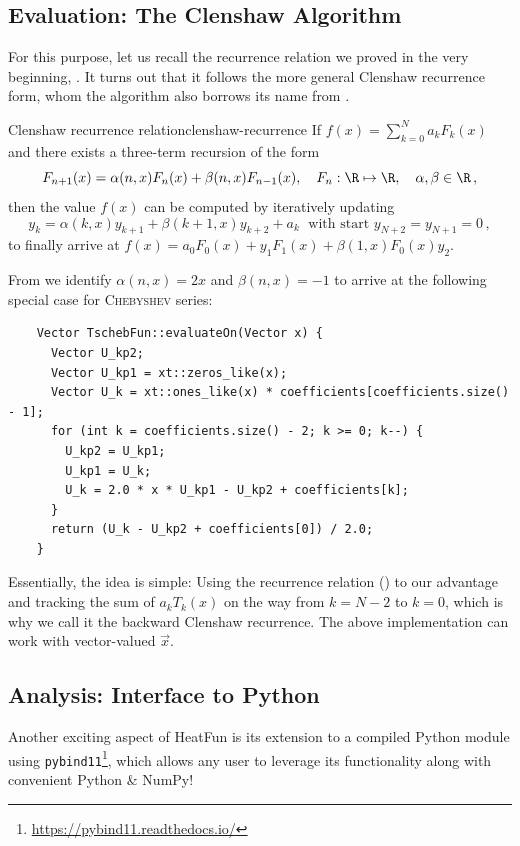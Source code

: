 \documentclass[12pt, a4paper]{article}
\newcommand{\chebyshev}{\textsc{Chebyshev}\xspace}
\newcommand{\heatfun}{\textcolor{themecolor3}{HeatFun}\xspace}
\begin{document}
  \subsection{Evaluation: The Clenshaw Algorithm}
  For this purpose, let us recall the recurrence relation we proved in the very beginning, .
  It turns out that it follows the more general Clenshaw recurrence form, whom the algorithm also borrows its name from \parencite[172-178]{art-of-sci-comp}.
  \begin{theorem}{Clenshaw recurrence relation}{clenshaw-recurrence}
    If $f(x) = \sum_{k=0}^N a_k F_k(x)$ and there exists a three-term recursion of the form
    $$F_{n+1}(x)=\alpha(n,x) F_n(x) + \beta(n,x) F_{n-1}(x),\quad F_n: \R \mapsto \R, \quad \alpha, \beta \in \R \,,$$
    then the value $f(x)$ can be computed by iteratively updating
    $$y_k = \alpha(k,x)y_{k+1}+\beta(k+1,x)y_{k+2}+a_k \; \text{ with start } y_{N+2} = y_{N+1} = 0\,,$$
    to finally arrive at $f(x) = a_0F_0(x)+y_1F_1(x)+\beta(1,x)F_0(x)y_2$.
  \end{theorem}

  From  we identify $\alpha(n, x) = 2x$ and $\beta(n, x) = -1$ to arrive at the following special case for \chebyshev series:
  \begin{verbatim}
    Vector TschebFun::evaluateOn(Vector x) {
      Vector U_kp2;
      Vector U_kp1 = xt::zeros_like(x);
      Vector U_k = xt::ones_like(x) * coefficients[coefficients.size() - 1];
      for (int k = coefficients.size() - 2; k >= 0; k--) {
        U_kp2 = U_kp1;
        U_kp1 = U_k;
        U_k = 2.0 * x * U_kp1 - U_kp2 + coefficients[k];
      }
      return (U_k - U_kp2 + coefficients[0]) / 2.0;
    }
  \end{verbatim}

  Essentially, the idea is simple: Using the recurrence relation () to our advantage and tracking the sum of $a_k T_k(x)$ on the way from $k = N-2$ to $k=0$, which is why we call it the backward Clenshaw recurrence.
  The above implementation can work with vector-valued $\vec{x}$.

  \subsection{Analysis: Interface to Python}
  Another exciting aspect of \heatfun is its extension to a compiled Python module using \texttt{pybind11}\footnote{\url{https://pybind11.readthedocs.io/}}, which allows any user to leverage its functionality along with convenient Python \& NumPy!
\end{document}
